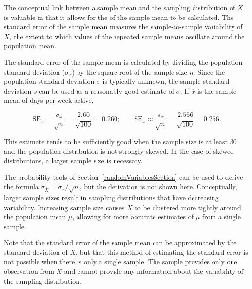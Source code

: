 \begin{spacing}{1.5}
The conceptual link between a sample mean and the sampling distribution of $\overline{X}$ is valuable in that it allows for the  of the sample mean to be calculated. The standard error of the sample mean measures the sample-to-sample variability of $\overline{X}$, the extent to which values of the repeated sample means oscillate around the population mean. 

The standard error of the sample mean is calculated by dividing the population standard deviation ($\sigma_{x}$) by the square root of the sample size $n$. Since the population standard deviation $\sigma$ is typically unknown, the sample standard deviation $s$ can be used as a reasonably good estimate of $\sigma$. If $\overline{x}$ is the sample mean of days per week active,

\[\text{SE}_{\overline{x}} = \dfrac{\sigma_{x}}{\sqrt{n}} = \dfrac{2.60}{\sqrt{100}} = 0.260;  \qquad \text{SE}_{\overline{x}} \approx \dfrac{s_{x}}{\sqrt{n}} = \dfrac{2.556}{\sqrt{100}} = 0.256.\]

This estimate tends to be sufficiently good when the sample size is at least 30 and the population distribution is not strongly skewed. In the case of skewed distributions, a larger sample size is necessary.

The probability tools of Section~\ref{randomVariablesSection} can be used to derive the formula $\sigma_{\overline{X}} = \sigma_x/\sqrt{n}$, but the derivation is not shown here. Conceptually, larger sample sizes result in sampling distributions that have decreasing variability. Increasing sample size causes $\overline{X}$ to be clustered more tightly around the population mean $\mu$, allowing for more accurate estimates of $\mu$ from a single sample.

Note that the standard error of the sample mean can be approximated by the standard deviation of $\overline{X}$, but that this method of estimating the standard error is not possible when there is only a single sample. The sample provides only one observation from $\overline{X}$ and cannot provide any information about the variability of the sampling distribution.




\end{spacing}
